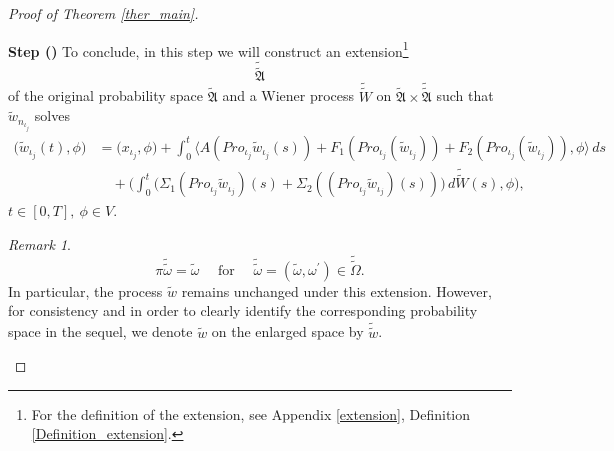\documentclass[english,a4paper,11pt]{amsart}
\theoremstyle{plain}
\theoremstyle{definition}
\theoremstyle{remark}
\newtheorem{remark}[theorem]{Remark}
\numberwithin{equation}{section}
\newcounter{lil1}
\newenvironment{step}
{\begin{list} { \bf Step (\Roman{lil1})}
		{ \usecounter{lil1}
			\setlength{\leftmargin}{0.0cm}
			\setlength{\topsep}{0.2cm}
			\setlength{\itemsep}{0.0cm}
			\setlength{\parsep}{0.1cm}
			\setlength{\itemindent}{0.8cm}
			\setlength{\parskip}{0.0cm}}}
	{\end{list}}
\newcounter{lil33}
\newcounter{lil1q}
\newcommand{\wi}[1]{{\widetilde{#1}}}
\def\wi{\widetilde}
\newcommand{\la}{\langle}
\newcommand{\ra}{\rangle}
\newcommand{\Pro}{Pro}
\begin{document}
\begin{proof}[Proof of Theorem \ref{ther_main}]
\begin{step}
{}		
To conclude, in this  step we will  construct an extension\footnote{For the definition of the extension, see Appendix \ref{extension}, Definition \ref{Definition_extension}.} 
$$\widetilde{\widetilde{\mathfrak{A}}}$$
 of the original probability space $\widetilde{\mathfrak{A}}$ and a Wiener process 
$\widetilde{\widetilde{W}}$ on $\widetilde{\mathfrak{A}}\times \widetilde{\widetilde{\mathfrak{A}}}$ such that $\widetilde{w}_{n_{\iota_j}}$ solves
	\newcommand{\wwt}{\widetilde{w}}
{\begin{align*} \nonumber \big( \wi{w}_{{\iota_j}} (t),\phi \big)
		&=\big( x_{{\iota_j}}, \phi\big)+\int_{0}^{t} 
		\big\la 	A ( \Pro_{{\iota_j}}\wi{w}_{{\iota_j}}(s))+F_1(\Pro_{\iota_j}(\wi{w}_{\iota_j}))+F_2(\Pro_{\iota_j}(\wi{w}_{\iota_j})),\phi\big\ra\, ds
		\\	&\quad +\bigg( \int^t_0 \big(\Sigma_1(\Pro_{{\iota_j}}	\wi{w}_{{\iota_j}})(s)+\Sigma_2((\Pro_{{\iota_j}}	\wi{w}_{{\iota_j}})(s)) \big)\,d\wi{\wi{W}}(s),\phi\bigg), 
		 \end{align*} $t\in[0,T],\  \phi\in V$.}
\begin{remark}\label{wtilde}
	$$
	\pi \wi{\wi{\omega}}=\wi \omega \quad \text { for } \quad \wi {\wi{\omega}}=\left(\wi \omega, \omega^{\prime}\right) \in \wi{\wi{\Omega}}.
	$$
	In particular, the process $\wi{w}$  remains unchanged under this extension. However, for consistency and in order to clearly identify the corresponding probability space in the sequel, we denote $\wi{w}$  on the enlarged space by $\wi{\wi{w}}$. 
\end{remark}
	

\end{step}
\end{proof}
\end{document}
